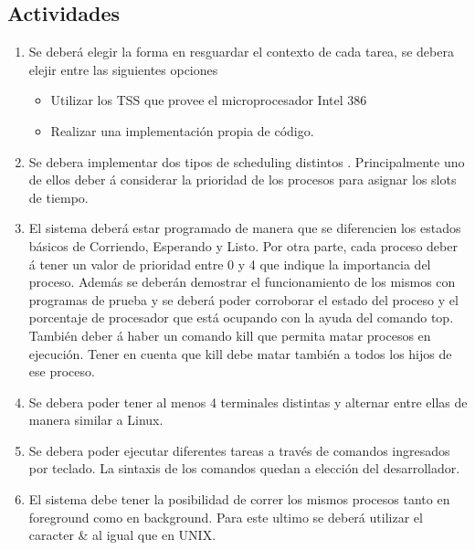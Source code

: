 \documentclass[10pt,a4paper]{article}
\begin{document}
	\subsection{Actividades}
		\begin{enumerate}	
			\item Se deber\'a elegir la forma en resguardar el contexto de cada tarea, se debera elejir entre las siguientes opciones
			\begin{itemize}
				\item Utilizar los TSS que provee el microprocesador Intel 386 
				\item Realizar una implementaci\'on propia de c\'odigo.
			\end{itemize}

			\item Se debera implementar dos tipos de scheduling distintos . Principalmente uno de ellos deber \'a considerar la prioridad de los procesos para asignar los slots de tiempo.

			\item El sistema deber\'a estar programado de manera que se diferencien los estados b\'asicos de Corriendo, Esperando y Listo. Por otra parte, cada proceso deber \'a tener un valor de prioridad entre 0 y 4 que indique la importancia del proceso.  Adem\'as se deber\'an demostrar el funcionamiento de los mismos con programas de prueba y se deber\'a poder corroborar el estado del proceso y el porcentaje de procesador que est\'a ocupando con la ayuda del comando top. Tambi\'en deber \'a haber un comando kill que permita matar procesos en ejecuci\'on. Tener en cuenta que kill debe matar tambi\'en a todos los hijos de ese proceso.


			\item Se debera poder tener al menos 4 terminales distintas y alternar entre ellas de manera similar a Linux.

			\item Se debera poder ejecutar diferentes tareas a trav\'es de comandos ingresados por teclado. La sintaxis de los comandos quedan a elecci\'on del desarrollador.

			\item El sistema debe tener la posibilidad de correr los mismos procesos tanto en foreground como en background. Para este ultimo se deber\'a utilizar el caracter & al igual que en UNIX.


\end{enumerate}
\end{document}
